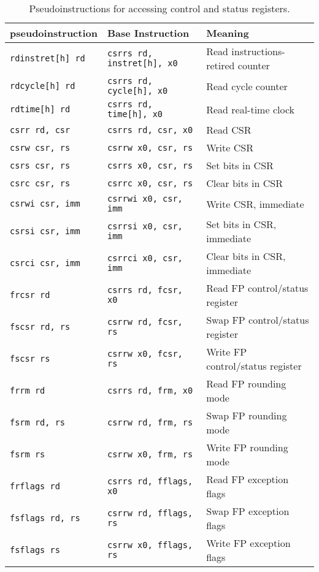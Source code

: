\begin{table}[h]
\begin{small}
\begin{center}
\begin{tabular}{l l l}
pseudoinstruction & Base Instruction & Meaning \\ \hline

{\tt rdinstret[h] rd} & {\tt csrrs rd, instret[h], x0} & Read instructions-retired counter \\
{\tt rdcycle[h] rd} & {\tt csrrs rd, cycle[h], x0} & Read cycle counter \\
{\tt rdtime[h] rd} & {\tt csrrs rd, time[h], x0} & Read real-time clock \\
\hline
{\tt csrr rd, csr} & {\tt csrrs rd, csr, x0} & Read CSR \\
{\tt csrw csr, rs} & {\tt csrrw x0, csr, rs} & Write CSR \\
{\tt csrs csr, rs} & {\tt csrrs x0, csr, rs} & Set bits in CSR \\
{\tt csrc csr, rs} & {\tt csrrc x0, csr, rs} & Clear bits in CSR \\
\hline
{\tt csrwi csr, imm} & {\tt csrrwi x0, csr, imm} & Write CSR, immediate \\
{\tt csrsi csr, imm} & {\tt csrrsi x0, csr, imm} & Set bits in CSR, immediate \\
{\tt csrci csr, imm} & {\tt csrrci x0, csr, imm} & Clear bits in CSR, immediate \\
\hline
{\tt frcsr rd} & {\tt csrrs rd, fcsr, x0} & Read FP control/status register \\
{\tt fscsr rd, rs} & {\tt csrrw rd, fcsr, rs} & Swap FP control/status register \\
{\tt fscsr rs} & {\tt csrrw x0, fcsr, rs} & Write FP control/status register \\
\hline
{\tt frrm rd} & {\tt csrrs rd, frm, x0} & Read FP rounding mode \\
{\tt fsrm rd, rs} & {\tt csrrw rd, frm, rs} & Swap FP rounding mode \\
{\tt fsrm rs} & {\tt csrrw x0, frm, rs} & Write FP rounding mode \\
\hline
{\tt frflags rd} & {\tt csrrs rd, fflags, x0} & Read FP exception flags \\
{\tt fsflags rd, rs} & {\tt csrrw rd, fflags, rs} & Swap FP exception flags \\
{\tt fsflags rs} & {\tt csrrw x0, fflags, rs} & Write FP exception flags \\
\hline

\end{tabular}
\end{center}
\end{small}
\caption{Pseudoinstructions for accessing control and status registers.}
\label{csr-pseudos}
\end{table}
